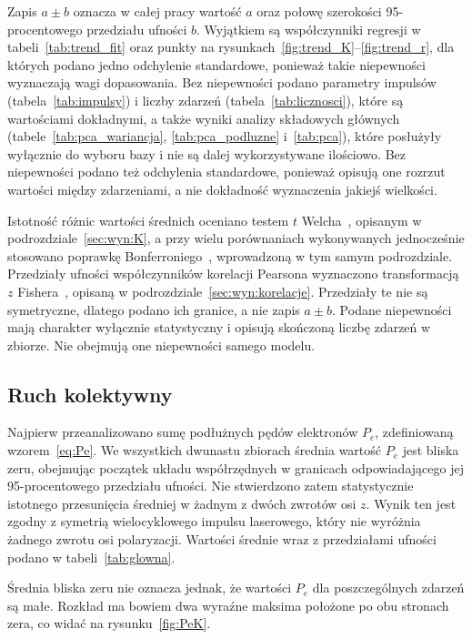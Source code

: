 \documentclass[12pt,a4paper]{article}
\begin{document}
Zapis $a\pm b$ oznacza w całej pracy wartość $a$ oraz połowę szerokości
95-procentowego przedziału ufności $b$. Wyjątkiem są współczynniki
regresji w tabeli~\ref{tab:trend_fit} oraz punkty na
rysunkach~\ref{fig:trend_K}--\ref{fig:trend_r}, dla których podano
jedno odchylenie standardowe, ponieważ takie niepewności wyznaczają wagi
dopasowania. Bez niepewności podano parametry impulsów
(tabela~\ref{tab:impulsy}) i liczby zdarzeń
(tabela~\ref{tab:licznosci}), które są wartościami dokładnymi, a także
wyniki analizy składowych głównych
(tabele~\ref{tab:pca_wariancja}, \ref{tab:pca_podluzne}
i~\ref{tab:pca}), które posłużyły wyłącznie do wyboru bazy i nie są
dalej wykorzystywane ilościowo. Bez niepewności podano też odchylenia
standardowe, ponieważ opisują one rozrzut wartości między zdarzeniami,
a nie dokładność wyznaczenia jakiejś wielkości.

Istotność różnic wartości średnich oceniano testem
\(t\) Welcha~\cite{Welch1947}, opisanym w podrozdziale~\ref{sec:wyn:K},
a przy wielu porównaniach wykonywanych jednocześnie stosowano poprawkę
Bonferroniego~\cite{Dunn1961}, wprowadzoną w tym samym podrozdziale.
Przedziały ufności współczynników korelacji Pearsona wyznaczono
transformacją \(z\) Fishera~\cite{Fisher1921,Cox2008}, opisaną
w podrozdziale~\ref{sec:wyn:korelacje}. Przedziały te nie są
symetryczne, dlatego podano ich granice, a nie zapis $a\pm b$. Podane niepewności mają
charakter wyłącznie statystyczny i opisują skończoną liczbę zdarzeń
w zbiorze. Nie obejmują one niepewności samego modelu.

\subsection{Ruch kolektywny}
\label{sec:wyn:Pe}

Najpierw przeanalizowano sumę podłużnych pędów elektronów $P_e$,
zdefiniowaną wzorem~\eqref{eq:Pe}. We wszystkich dwunastu zbiorach
średnia wartość $P_e$ jest bliska zeru, obejmując początek układu
współrzędnych w granicach odpowiadającego jej 95-procentowego
przedziału ufności. Nie stwierdzono zatem statystycznie istotnego
przesunięcia średniej w żadnym z dwóch zwrotów osi \(z\). Wynik ten
jest zgodny z symetrią wielocyklowego impulsu laserowego, który nie
wyróżnia żadnego zwrotu osi polaryzacji. Wartości średnie wraz z
przedziałami ufności podano w tabeli~\ref{tab:glowna}.

Średnia bliska zeru nie oznacza jednak, że wartości \(P_e\) dla
poszczególnych zdarzeń są małe. Rozkład ma bowiem dwa wyraźne maksima
położone po obu stronach zera, co widać na rysunku~\ref{fig:PeK}.
\end{document}
